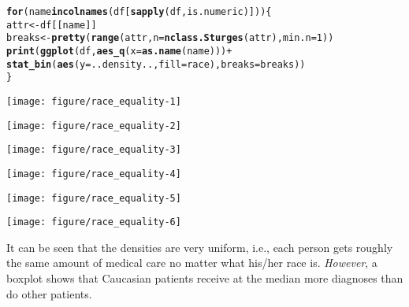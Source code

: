 \documentclass{article}\usepackage[]{graphicx}\usepackage[]{color}
\makeatletter
\def\maxwidth{ %
  \ifdim\Gin@nat@width>\linewidth
    \linewidth
  \else
    \Gin@nat@width
  \fi
}
\newcommand{\hlnum}[1]{\textcolor[rgb]{0.686,0.059,0.569}{#1}}%
\newcommand{\hlopt}[1]{\textcolor[rgb]{0,0,0}{#1}}%
\newcommand{\hlstd}[1]{\textcolor[rgb]{0.345,0.345,0.345}{#1}}%
\newcommand{\hlkwa}[1]{\textcolor[rgb]{0.161,0.373,0.58}{\textbf{#1}}}%
\newcommand{\hlkwb}[1]{\textcolor[rgb]{0.69,0.353,0.396}{#1}}%
\newcommand{\hlkwc}[1]{\textcolor[rgb]{0.333,0.667,0.333}{#1}}%
\newcommand{\hlkwd}[1]{\textcolor[rgb]{0.737,0.353,0.396}{\textbf{#1}}}%
\newenvironment{kframe}{%
 \def\at@end@of@kframe{}%
 \ifinner\ifhmode%
  \def\at@end@of@kframe{\end{minipage}}%
  \begin{minipage}{\columnwidth}%
 \fi\fi%
 \def\FrameCommand##1{\hskip\@totalleftmargin \hskip-\fboxsep
 \colorbox{shadecolor}{##1}\hskip-\fboxsep
     \hskip-\linewidth \hskip-\@totalleftmargin \hskip\columnwidth}%
 \MakeFramed {\advance\hsize-\width
   \@totalleftmargin\z@ \linewidth\hsize
   \@setminipage}}%
 {\par\unskip\endMakeFramed%
 \at@end@of@kframe}
\newenvironment{knitrout}{}{} %
\makeatother
\begin{document}
\begin{knitrout}
\color{fgcolor}\begin{kframe}
\begin{alltt}
\hlkwa{for} \hlstd{(name} \hlkwa{in} \hlkwd{colnames}\hlstd{(df[}\hlkwd{sapply}\hlstd{(df, is.numeric)])) \{}
    \hlstd{attr} \hlkwb{<-} \hlstd{df[[name]]}
    \hlstd{breaks} \hlkwb{<-} \hlkwd{pretty}\hlstd{(}\hlkwd{range}\hlstd{(attr,} \hlkwc{n}\hlstd{=}\hlkwd{nclass.Sturges}\hlstd{(attr),} \hlkwc{min.n}\hlstd{=}\hlnum{1}\hlstd{))}
    \hlkwd{print}\hlstd{(}\hlkwd{ggplot}\hlstd{(df,} \hlkwd{aes_q}\hlstd{(}\hlkwc{x}\hlstd{=}\hlkwd{as.name}\hlstd{(name)))} \hlopt{+}
          \hlkwd{stat_bin}\hlstd{(}\hlkwd{aes}\hlstd{(}\hlkwc{y}\hlstd{=..density..,} \hlkwc{fill}\hlstd{=race),} \hlkwc{breaks}\hlstd{=breaks))}
\hlstd{\}}
\end{alltt}
\end{kframe}

{\centering \texttt{[image: figure/race\_equality-1]} 

}




{\centering \texttt{[image: figure/race\_equality-2]} 

}




{\centering \texttt{[image: figure/race\_equality-3]} 

}




{\centering \texttt{[image: figure/race\_equality-4]} 

}




{\centering \texttt{[image: figure/race\_equality-5]} 

}




{\centering \texttt{[image: figure/race\_equality-6]} 

}



\end{knitrout}

It can be seen that the densities are very uniform, i.e., each person gets
roughly the same amount of medical care no matter what his/her race is.
\emph{However}, a boxplot shows that Caucasian patients receive at the median
more diagnoses than do other patients.
\end{document}
